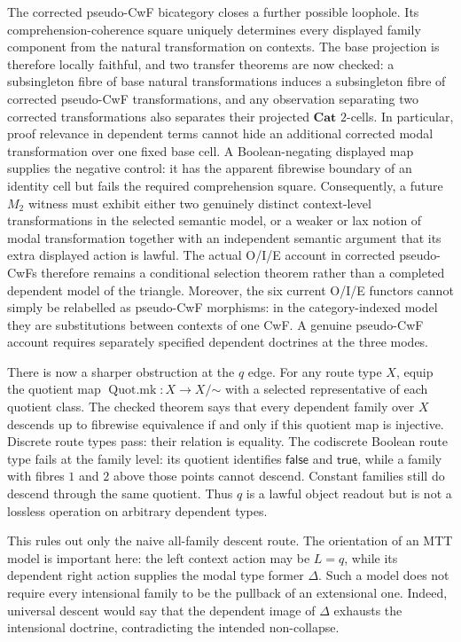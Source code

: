 \documentclass[11pt]{article}
\theoremstyle{definition}
\theoremstyle{remark}
\begin{document}
The corrected pseudo-CwF bicategory closes a further possible loophole.  Its
comprehension-coherence square uniquely determines every displayed family
component from the natural transformation on contexts.  The base projection is
therefore locally faithful, and two transfer theorems are now checked: a
subsingleton fibre of base natural transformations induces a subsingleton
fibre of corrected pseudo-CwF transformations, and any observation separating
two corrected transformations also separates their projected
$\mathbf{Cat}$ $2$-cells.  In particular, proof relevance in dependent terms
cannot hide an additional corrected modal transformation over one fixed base
cell.  A Boolean-negating displayed map supplies the negative control: it has
the apparent fibrewise boundary of an identity cell but fails the required
comprehension square.  Consequently, a future $M_2$ witness must exhibit either
two genuinely distinct context-level transformations in the selected semantic
model, or a weaker or lax notion of modal transformation together with an
independent semantic argument that its extra displayed action is lawful.  The
actual O/I/E account in corrected pseudo-CwFs therefore remains a conditional
selection theorem rather than a completed dependent model of the triangle.
Moreover, the six current O/I/E functors cannot simply be relabelled as
pseudo-CwF morphisms: in the category-indexed model they are substitutions
between contexts of one CwF.  A genuine pseudo-CwF account requires separately
specified dependent doctrines at the three modes.

There is now a sharper obstruction at the $q$ edge.  For any route type $X$,
equip the quotient map
$\operatorname{Quot.mk}:X\to X/{\mathord\sim}$ with a selected representative
of each quotient class.  The checked theorem says that every dependent family
over $X$ descends up to fibrewise equivalence if and only if this quotient map
is injective.  Discrete route types pass: their relation is equality.  The
codiscrete Boolean route type fails at the family level: its quotient identifies
$\mathsf{false}$ and $\mathsf{true}$, while a family with fibres $1$ and $2$
above those points cannot descend.  Constant families still do descend through
the same quotient.  Thus $q$ is a lawful object readout but is not a lossless
operation on arbitrary dependent types.

This rules out only the naive all-family descent route.  The orientation of an
MTT model is important here: the left context action may be $L=q$, while its
dependent right action supplies the modal type former $\Delta$.  Such a model
does not require every intensional family to be the pullback of an extensional
one.  Indeed, universal descent would say that the dependent image of
$\Delta$ exhausts the intensional doctrine, contradicting the intended
non-collapse.
\end{document}
